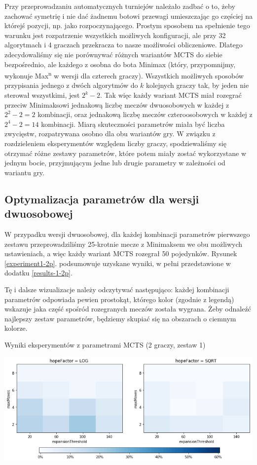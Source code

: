 \documentclass{pracamgr}
\begin{document}
Przy przeprowadzaniu automatycznych turniejów należało zadbać o to, żeby zachować symetrię i nie dać żadnemu botowi przewagi umieszczając go częściej na którejś pozycji, np. jako rozpoczynającego.
Prostym sposobem na spełnienie tego warunku jest rozpatrzenie wszystkich możliwych konfiguracji, ale przy 32 algorytmach i 4 graczach przekracza to nasze możliwości obliczeniowe.
Dlatego zdecydowaliśmy się nie porównywać różnych wariantów MCTS do siebie bezpośrednio, ale każdego z osobna do bota Minimax (który, przypomnijmy, wykonuje Max\textsuperscript{n} w wersji dla czterech graczy).
Wszystkich możliwych sposobów przypisania jednego z dwóch algorytmów do \(k\) kolejnych graczy tak, by jeden nie sterował wszystkimi, jest \(2^k - 2\).
Tak więc każdy wariant MCTS miał rozegrać przeciw Minimaksowi jednakową liczbę meczów dwuosobowych w każdej z \(2^2 -2 = 2\) kombinacji, oraz jednakową liczbę meczów czteroosobowych w każdej z \(2^4 - 2 = 14\) kombinacji.
Miarą skuteczności parametrów miała być liczba zwycięstw, rozpatrywana osobno dla obu wariantów gry.
W związku z rozdzieleniem eksperymentów względem liczby graczy, spodziewaliśmy się otrzymać różne zestawy parametrów, które potem miały zostać wykorzystane w jednym bocie, przyjmującym jedne lub drugie parametry w zależności od wariantu gry.

\subsection{Optymalizacja parametrów dla wersji dwuosobowej}

W przypadku wersji dwuosobowej, dla każdej kombinacji parametrów pierwszego zestawu przeprowadziliśmy 25-krotnie mecze z Minimaksem we obu możliwych ustawieniach, a więc każdy wariant MCTS rozegrał 50 pojedynków.
Rysunek \ref{experiment1-2p}. podsumowuje uzyskane wyniki, w pełni przedstawione w dodatku \ref{results-1-2p}.

Tę i dalsze wizualizacje należy odczytywać następująco: każdej kombinacji parametrów odpowiada pewien prostokąt, którego kolor (zgodnie z legendą) wskazuje jaka część spośród rozegranych meczów została wygrana.
Żeby odnaleźć najlepszy zestaw parametrów, będziemy skupiać się na obszarach o ciemnym kolorze.

\begin{rysunek}
\caption{Wyniki eksperymentów z parametrami MCTS (2 graczy, zestaw 1) \label{experiment1-2p}}
\centering
\includegraphics[width=140mm]{experiment1-2p.png}
\end{rysunek}
\end{document}
